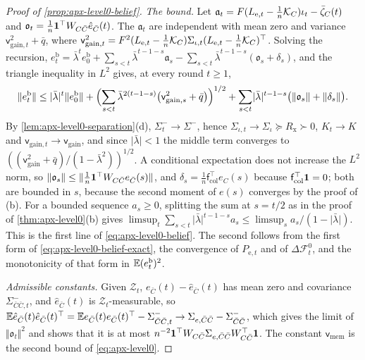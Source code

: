 \begin{proof}[Proof of \cref{prop:apx-level0-belief}]
\emph{The bound.} Let $\mathfrak a_t=F(L_{\mathrm e,t}-\frac1n\mathcal{K}_C)\iota_t-\bar\zeta_C(t)$ and $\mathfrak o_t=\frac1n\mathbf{1}^\top W_{C\bar C}\hat e_{\bar C}(t)$. The $\mathfrak a_t$ are independent with mean zero and variance $\mathsf v_{\mathrm{gain},t}^2+\bar q$, where $\mathsf v_{\mathrm{gain},t}^2=F^2(L_{\mathrm e,t}-\frac1n\mathcal{K}_C)\Sigma_{\iota,t}(L_{\mathrm e,t}-\frac1n\mathcal{K}_C)^\top$. Solving the recursion, $e^{\mathrm b}_t=\bar\lambda^te^{\mathrm b}_0+\sum_{s<t}\bar\lambda^{t-1-s}\mathfrak a_s-\sum_{s<t}\bar\lambda^{t-1-s}(\mathfrak o_s+\delta_s)$, and the triangle inequality in $L^2$ gives, at every round $t\ge1$,
\begin{equation}\label{eq:apx-level0-belief-round}
\Vert e^{\mathrm b}_t\Vert\le\lvert\bar\lambda\rvert^t\Vert e^{\mathrm b}_0\Vert+\Bigl(\sum_{s<t}\bar\lambda^{2(t-1-s)}\bigl(\mathsf v_{\mathrm{gain},s}^2+\bar q\bigr)\Bigr)^{1/2}+\sum_{s<t}\lvert\bar\lambda\rvert^{t-1-s}\bigl(\Vert\mathfrak o_s\Vert+\Vert\delta_s\Vert\bigr).
\end{equation}
By \cref{lem:apx-level0-separation}(d), $\Sigma^-_t\to\Sigma^-$, hence $\Sigma_{\iota,t}\to\Sigma_\iota\succeq R_{\mathrm x}\succ0$, $K_t\to K$ and $\mathsf v_{\mathrm{gain},t}\to\mathsf v_{\mathrm{gain}}$, and since $\lvert\bar\lambda\rvert<1$ the middle term converges to $((\mathsf v_{\mathrm{gain}}^2+\bar q)/(1-\bar\lambda^2))^{1/2}$. A conditional expectation does not increase the $L^2$ norm, so $\Vert\mathfrak o_s\Vert\le\Vert\frac1n\mathbf{1}^\top W_{C\bar C}e_{\bar C}(s)\Vert$, and $\delta_s=\frac1n\mathsf f_{\mathrm{col}}^\top e_C(s)$ because $\mathsf f_{\mathrm{col}}^\top\mathbf{1}=0$; both are bounded in $s$, because the second moment of $e(s)$ converges by the proof of (b). For a bounded sequence $a_s\ge0$, splitting the sum at $s=t/2$ as in the proof of \cref{thm:apx-level0}(b) gives $\limsup_t\sum_{s<t}\lvert\bar\lambda\rvert^{t-1-s}a_s\le\limsup_sa_s/(1-\lvert\bar\lambda\rvert)$. This is the first line of \eqref{eq:apx-level0-belief}. The second follows from the first form of \eqref{eq:apx-level0-belief-exact}, the convergence of $P_{\mathrm e,t}$ and of $\Delta\mathcal F^0_t$, and the monotonicity of that form in $\mathbb{E}(e^{\mathrm b}_t)^2$.

\emph{Admissible constants.} Given $\mathcal Z_t$, $e_{\bar C}(t)-\hat e_{\bar C}(t)$ has mean zero and covariance $\Sigma^-_{\bar C\bar C,t}$, and $\hat e_{\bar C}(t)$ is $\mathcal Z_t$-measurable, so $\mathbb{E}\hat e_{\bar C}(t)\hat e_{\bar C}(t)^\top=\mathbb{E} e_{\bar C}(t)e_{\bar C}(t)^\top-\Sigma^-_{\bar C\bar C,t}\to\Sigma_{e,\bar C\bar C}-\Sigma^-_{\bar C\bar C}$, which gives the limit of $\Vert\mathfrak o_t\Vert^2$ and shows that it is at most $n^{-2}\mathbf{1}^\top W_{C\bar C}\Sigma_{e,\bar C\bar C}W_{C\bar C}^\top\mathbf{1}$. The constant $\mathsf v_{\mathrm{mem}}$ is the second bound of \eqref{eq:apx-level0}.


\end{proof}
